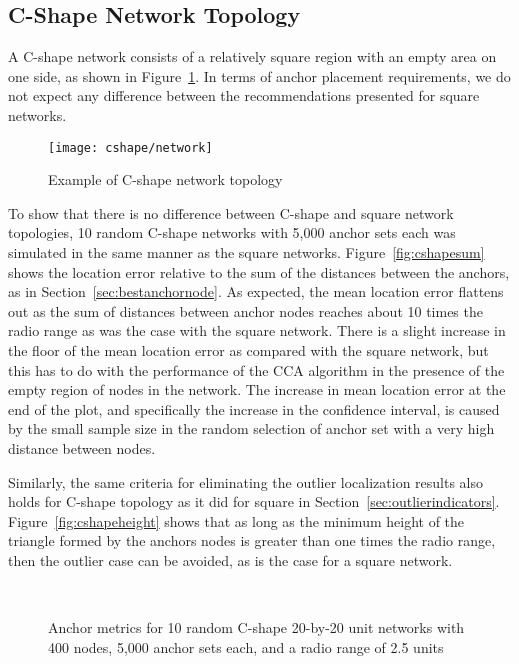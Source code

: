\subsection{C-Shape Network Topology}

A C-shape network consists of a relatively square region with an empty area on one side, as shown in Figure~\ref{fig:cnetwork}.  In terms of anchor placement requirements, we do not expect any difference between the recommendations presented for square networks.

\begin{figure}
  \centering
	\texttt{[image: cshape/network]}
	\caption{Example of C-shape network topology}
	\label{fig:cnetwork}
\end{figure}

To show that there is no difference between C-shape and square network topologies, 10 random C-shape networks with 5,000 anchor sets each was simulated in the same manner as the square networks.  Figure~\ref{fig:cshapesum} shows the location error relative to the sum of the distances between the anchors, as in Section~\ref{sec:bestanchornode}.  As expected, the mean location error flattens out as the sum of distances between anchor nodes reaches about 10 times the radio range as was the case with the square network.  There is a slight increase in the floor of the mean location error as compared with the square network, but this has to do with the performance of the CCA algorithm in the presence of the empty region of nodes in the network.  The increase in mean location error at the end of the plot, and specifically the increase in the confidence interval, is caused by the small sample size in the random selection of anchor set with a very high distance between nodes.
 
Similarly, the same criteria for eliminating the outlier localization results also holds for C-shape topology as it did for square in Section~\ref{sec:outlierindicators}.  Figure~\ref{fig:cshapeheight} shows that as long as the minimum height of the triangle formed by the anchors nodes is greater than one times the radio range, then the outlier case can be avoided, as is the case for a square network.

\begin{figure}
  \centering
	\\
	\caption[Anchor metrics for a C-Shape topology]{Anchor metrics for 10 random C-shape 20-by-20 unit networks with 400 nodes, 5,000 anchor sets each, and a radio range of 2.5 units}
	\label{fig:cindicator}
\end{figure}

